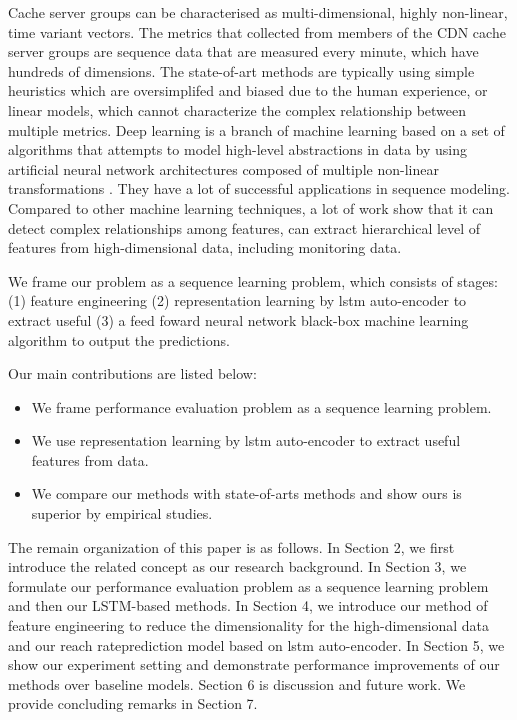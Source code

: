 \documentclass[5p]{elsarticle}
\newcommand{\dabiaolv}{reach rate}
\begin{document}
Cache server groups can be characterised as multi-dimensional, highly non-linear, time variant vectors. The metrics that collected from members of the CDN cache server groups are sequence data that are measured every minute, which have hundreds of dimensions. The state-of-art methods are typically using simple heuristics  which are oversimplifed and biased due to the human experience, or linear models, which cannot characterize the complex relationship between multiple metrics. Deep learning is a branch of machine learning based on a set of algorithms that attempts to model high-level abstractions in data by using artificial neural network architectures composed of multiple non-linear transformations \cite{Lecun2015}. They have a lot of successful applications in sequence modeling. Compared to other machine learning techniques, a lot of work show that it can detect complex relationships among features, can extract hierarchical level of features from high-dimensional data, including monitoring data.

We frame our problem as a sequence learning problem, which consists of stages: (1) feature engineering (2) representation learning by lstm auto-encoder to extract useful (3) a feed foward neural network black-box machine learning algorithm to output the predictions. 

Our main contributions are listed below:
\begin{itemize}
  \item We frame performance evaluation problem as a sequence learning problem.
  \item We use representation learning by lstm auto-encoder to extract useful features from data.
  \item We compare our methods with state-of-arts methods and show ours is superior by empirical studies.
\end{itemize}

The remain organization of this paper is as follows. In Section 2, we first introduce the related concept as our research background. In Section 3, we formulate our performance evaluation problem as a sequence learning problem and then our LSTM-based methods. In Section 4, we introduce our method of feature engineering to reduce the dimensionality for the high-dimensional data and  our \dabiaolv prediction model based on lstm auto-encoder. In Section 5, we show our experiment setting and demonstrate performance improvements of our methods over baseline models. Section 6 is discussion and future work. We provide concluding remarks in Section 7.
\end{document}
